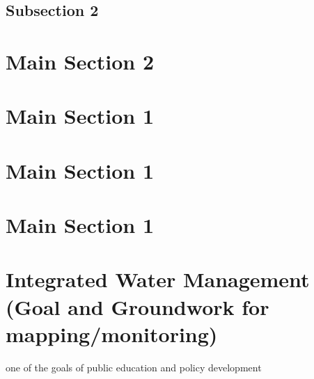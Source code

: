 \subsection{Subsection 2}


\section{Main Section 2}


\section{Main Section 1}


\section{Main Section 1}


\section{Main Section 1}


\section{Integrated Water Management (Goal and Groundwork for mapping/monitoring)}
one of the goals of public education and policy development



